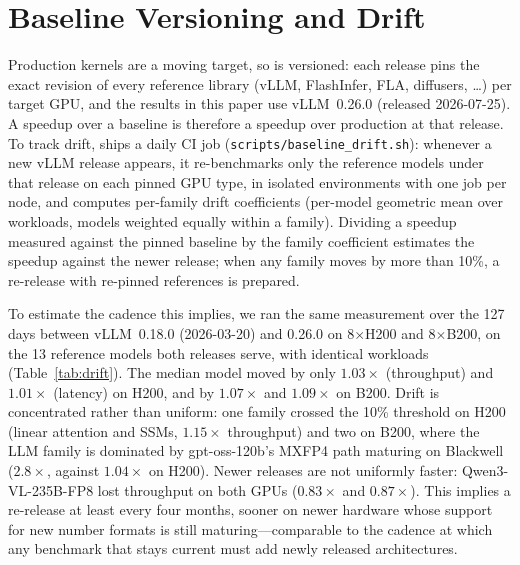 \section{Baseline Versioning and Drift}
\label{app:drift}

Production kernels are a moving target, so \fastkernels{} is versioned: each release pins the exact revision of every reference library (vLLM, FlashInfer, FLA, diffusers, \dots) per target GPU, and the results in this paper use vLLM~0.26.0 (released 2026-07-25).
A speedup over a \fastkernels{} baseline is therefore a speedup over production at that release.
To track drift, \fastkernels{} ships a daily CI job (\texttt{scripts/baseline\_drift.sh}): whenever a new vLLM release appears, it re-benchmarks only the reference models under that release on each pinned GPU type, in isolated environments with one job per node, and computes per-family drift coefficients (per-model geometric mean over workloads, models weighted equally within a family).
Dividing a speedup measured against the pinned baseline by the family coefficient estimates the speedup against the newer release; when any family moves by more than 10\%, a re-release with re-pinned references is prepared.

To estimate the cadence this implies, we ran the same measurement over the 127 days between vLLM~0.18.0 (2026-03-20) and 0.26.0 on 8$\times$H200 and 8$\times$B200, on the 13 reference models both releases serve, with identical workloads (Table~\ref{tab:drift}).
The median model moved by only $1.03\times$ (throughput) and $1.01\times$ (latency) on H200, and by $1.07\times$ and $1.09\times$ on B200.
Drift is concentrated rather than uniform: one family crossed the 10\% threshold on H200 (linear attention and SSMs, $1.15\times$ throughput) and two on B200, where the LLM family is dominated by gpt-oss-120b's MXFP4 path maturing on Blackwell ($2.8\times$, against $1.04\times$ on H200).
Newer releases are not uniformly faster: Qwen3-VL-235B-FP8 lost throughput on both GPUs ($0.83\times$ and $0.87\times$).
This implies a re-release at least every four months, sooner on newer hardware whose support for new number formats is still maturing---comparable to the cadence at which any benchmark that stays current must add newly released architectures.

\begin{table}[H]
  \centering
  \caption{\textbf{Reference drift from vLLM~0.18.0 to 0.26.0} (127 days), as computed by the baseline-drift CI job: speedup of the newer release (${>}1$: faster), per-model geometric mean over workloads, models weighted equally within a family.
  Latencies are 5-iteration medians (${<}1\%$ spread); throughput is one timed pass per workload, which three repeated runs per release of Qwen3-VL-235B-FP8 place within 1.5\%.
  On B200, six models needed \texttt{nvidia-cutlass-dsl==4.5.3} to import under vLLM~0.18.0.}
  \label{tab:drift}
  \small
  
\end{table}

